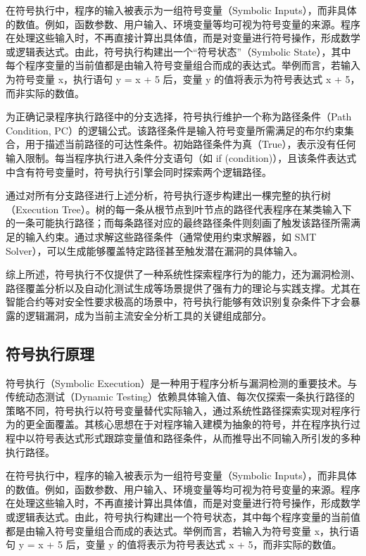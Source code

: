 \documentclass[print, master, vlined, timesmath]{DissertUESTC}
\begin{document}
在符号执行中，程序的输入被表示为一组符号变量（Symbolic Inputs），而非具体的数值。例如，函数参数、用户输入、环境变量等均可视为符号变量的来源。程序在处理这些输入时，不再直接计算出具体值，而是对变量进行符号操作，形成数学或逻辑表达式。由此，符号执行构建出一个“符号状态”（Symbolic State），其中每个程序变量的当前值都是由输入符号变量组合而成的表达式。举例而言，若输入为符号变量 x，执行语句 y = x + 5 后，变量 y 的值将表示为符号表达式 x + 5，而非实际的数值。

为正确记录程序执行路径中的分支选择，符号执行维护一个称为路径条件（Path Condition, PC）的逻辑公式。该路径条件是输入符号变量所需满足的布尔约束集合，用于描述当前路径的可达性条件。初始路径条件为真（True），表示没有任何输入限制。每当程序执行进入条件分支语句（如 if (condition)），且该条件表达式中含有符号变量时，符号执行引擎会同时探索两个逻辑路径。

通过对所有分支路径进行上述分析，符号执行逐步构建出一棵完整的执行树（Execution Tree）。树的每一条从根节点到叶节点的路径代表程序在某类输入下的一条可能执行路径；而每条路径对应的最终路径条件则刻画了触发该路径所需满足的输入约束。通过求解这些路径条件（通常使用约束求解器，如 SMT Solver），可以生成能够覆盖特定路径甚至触发潜在漏洞的具体输入。

综上所述，符号执行不仅提供了一种系统性探索程序行为的能力，还为漏洞检测、路径覆盖分析以及自动化测试生成等场景提供了强有力的理论与实践支撑。尤其在智能合约等对安全性要求极高的场景中，符号执行能够有效识别复杂条件下才会暴露的逻辑漏洞，成为当前主流安全分析工具的关键组成部分。

\subsection{符号执行原理}
符号执行（Symbolic Execution）是一种用于程序分析与漏洞检测的重要技术。与传统动态测试（Dynamic Testing）依赖具体输入值、每次仅探索一条执行路径的策略不同，符号执行以符号变量替代实际输入，通过系统性路径探索实现对程序行为的更全面覆盖。其核心思想在于对程序输入建模为抽象的符号，并在程序执行过程中以符号表达式形式跟踪变量值和路径条件，从而推导出不同输入所引发的多种执行路径。

在符号执行中，程序的输入被表示为一组符号变量（Symbolic Inputs），而非具体的数值。例如，函数参数、用户输入、环境变量等均可视为符号变量的来源。程序在处理这些输入时，不再直接计算出具体值，而是对变量进行符号操作，形成数学或逻辑表达式。由此，符号执行构建出一个符号状态，其中每个程序变量的当前值都是由输入符号变量组合而成的表达式。举例而言，若输入为符号变量 x，执行语句 y = x + 5 后，变量 y 的值将表示为符号表达式 x + 5，而非实际的数值。
\end{document}
